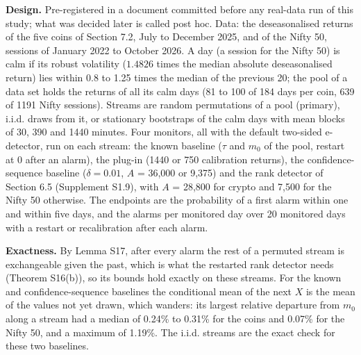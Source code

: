 \documentclass[
]{article}
\begin{document}
\textbf{Design.} Pre-registered in a document committed before any
real-data run of this study; what was decided later is called post hoc.
Data: the deseasonalised returns of the five coins of Section 7.2, July
to December 2025, and of the Nifty 50, sessions of January 2022 to
October 2026. A day (a session for the Nifty 50) is calm if its robust
volatility (\(1.4826\) times the median absolute deseasonalised return)
lies within 0.8 to 1.25 times the median of the previous 20; the pool of
a data set holds the returns of all its calm days (81 to 100 of 184 days
per coin, 639 of 1191 Nifty sessions). Streams are random permutations
of a pool (primary), i.i.d. draws from it, or stationary bootstraps of
the calm days with mean blocks of 30, 390 and 1440 minutes. Four
monitors, all with the default two-sided e-detector, run on each stream:
the known baseline (\(\tau\) and \(m_0\) of the pool, restart at 0 after
an alarm), the plug-in (1440 or 750 calibration returns), the
confidence-sequence baseline (\(\delta = 0.01\), \(A\) = 36,000 or
9,375) and the rank detector of Section 6.5 (Supplement S1.9), with
\(A\) = 28,800 for crypto and 7,500 for the Nifty 50 otherwise. The
endpoints are the probability of a first alarm within one and within
five days, and the alarms per monitored day over 20 monitored days with
a restart or recalibration after each alarm.

\textbf{Exactness.} By Lemma S17, after every alarm the rest of a
permuted stream is exchangeable given the past, which is what the
restarted rank detector needs (Theorem S16(b)), so its bounds hold
exactly on these streams. For the known and confidence-sequence
baselines the conditional mean of the next \(X\) is the mean of the
values not yet drawn, which wanders: its largest relative departure from
\(m_0\) along a stream had a median of 0.24\% to 0.31\% for the coins
and 0.07\% for the Nifty 50, and a maximum of 1.19\%. The i.i.d. streams
are the exact check for these two baselines.
\end{document}
